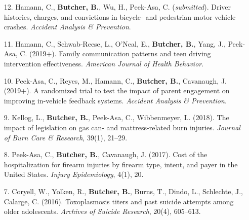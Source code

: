 \documentclass[a4paper]{article}
\begin{document}
\begin{enumerate}



  \item[12.] Hamann, C., \textbf{Butcher, B.}, Wu, H., Peek-Asa, C. (\textit{submitted}).
    Driver histories, charges, and convictions in bicycle- and pedestrian-motor
    vehicle crashes. \textit{Accident Analysis \& Prevention}.

  \item[11.] Hamann, C., Schwab-Reese, L., O'Neal, E., \textbf{Butcher, B.},
    Yang, J., Peek-Asa, C. (2019+). Family communication
    patterns and teen driving intervention effectiveness.
    \textit{American Journal of Health Behavior}.

  \item[10.] Peek-Asa, C., Reyes, M., Hamann, C., \textbf{Butcher, B.},
    Cavanaugh, J. (2019+). A randomized trial to test the impact
    of parent engagement on improving in-vehicle feedback systems.
    \textit{Accident Analysis \& Prevention}.

  \item[9.] Kellog, L., \textbf{Butcher, B.}, Peek-Asa, C., Wibbenmeyer, L. (2018).
    The impact of legislation on gas can- and mattress-related
    burn injuries. \textit{Journal of Burn Care \& Research}, 39(1), 21--29.

  \item[8.] Peek-Asa, C., \textbf{Butcher, B.}, Cavanaugh, J. (2017). Cost of the
    hospitalization for firearm injuries by firearm type, intent, and
    payer in the United States. \textit{Injury Epidemiology}, 4(1), 20.

  \item[7.] Coryell, W., Yolken, R., \textbf{Butcher, B.}, Burns, T., Dindo, L., Schlechte,
    J., Calarge, C. (2016). Toxoplasmosis titers and past suicide attempts among
    older adolescents. \textit{Archives of Suicide Research}, 20(4), 605--613.


\end{enumerate}
\end{document}
